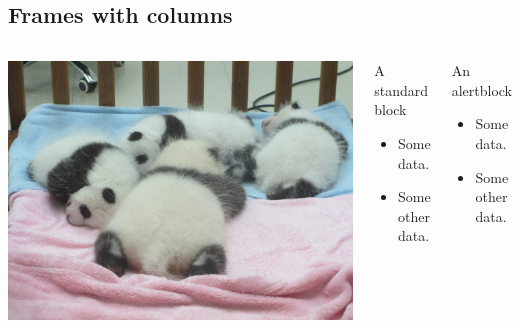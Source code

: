 \documentclass[11pt]{beamer}
\begin{document}
\subsection{Frames with columns}
\begin{frame}
    \begin{columns}[c] %
        \includegraphics[width = 1.\textwidth]{../figures/panda_puppies}
        \begin{block}{A standard block}
            \begin{itemize}
                \item Some data.
                \item Some other data.
            \end{itemize}
        \end{block}

        \begin{alertblock}{An alertblock}
            \begin{itemize}
                \item Some data.
                \item Some other data.
            \end{itemize}
        \end{alertblock}
    \end{columns}
\end{frame}
\end{document}
